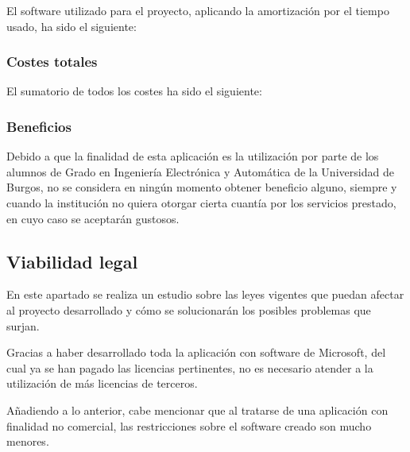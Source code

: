 El software utilizado para el proyecto, aplicando la amortización por el tiempo usado, ha sido el siguiente:


\subsubsection{Costes totales}

El sumatorio de todos los costes ha sido el siguiente:


\subsubsection{Beneficios}

Debido a que la finalidad de esta aplicación es la utilización por parte de los alumnos de Grado en Ingeniería Electrónica y Automática de la Universidad de Burgos, no se considera en ningún momento obtener beneficio alguno, siempre y cuando la institución no quiera otorgar cierta cuantía por los servicios prestado, en cuyo caso se aceptarán gustosos.

\subsection{Viabilidad legal}

En este apartado se realiza un estudio sobre las leyes vigentes que puedan afectar al proyecto desarrollado y cómo se solucionarán los posibles problemas que surjan.

Gracias a haber desarrollado toda la aplicación con software de Microsoft, del cual ya se han pagado las licencias pertinentes, no es necesario atender a la utilización de más licencias de terceros.

Añadiendo a lo anterior, cabe mencionar que al tratarse de una aplicación con finalidad no comercial, las restricciones sobre el software creado son mucho menores.

